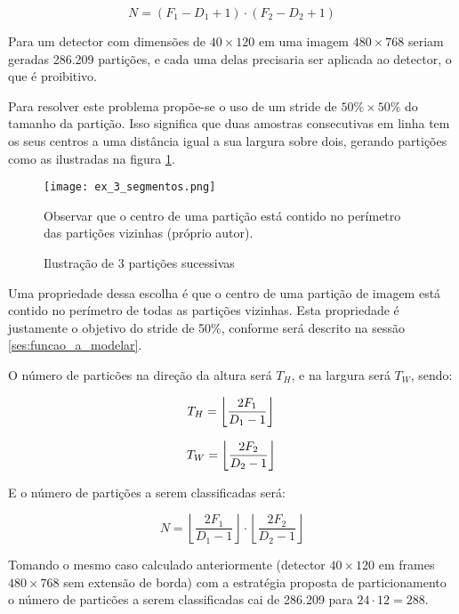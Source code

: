 \begin{equation}
	N = (F_1 - D_1 + 1) \cdot (F_2 - D_2 + 1)
\end{equation}

Para um detector com dimensões  de $40 \times 120$ em uma imagem
$480 \times 768$ seriam geradas 286.209 partições, e cada uma delas precisaria
ser aplicada ao detector, o que é proibitivo.

Para resolver este problema propõe-se o uso de um stride de
$50\% \times 50\%$ do tamanho da partição. Isso significa que duas amostras
consecutivas em linha tem os seus centros a uma distância igual a sua
largura sobre dois, gerando partições como as ilustradas na figura
\ref{fig:ex_3_segmentos}.

\begin{figure}[!htb]
	\centering
	\texttt{[image: ex\_3\_segmentos.png]}
	\caption{Ilustração de 3 partições sucessivas}
	\label{fig:ex_3_segmentos}
	Observar que o centro de uma partição está contido no perímetro das
	partições vizinhas (próprio autor).
\end{figure}

Uma propriedade dessa escolha é que o centro de uma partição de imagem está
contido no perímetro de todas as partições vizinhas. Esta propriedade é
justamente o objetivo do stride de 50\%, conforme será descrito na sessão
\ref{ses:funcao_a_modelar}.

O número de particões na direção da altura será $T_H$, e na largura será
$T_W$, sendo:

\begin{equation}
	T_H=\left\lfloor \frac{2F_1}{D_1-1} \right\rfloor \\
\end{equation}

\begin{equation}
	T_W=\left\lfloor \frac{2F_2}{D_2-1} \right\rfloor \\
\end{equation}

E o número de partições a serem classificadas será:

\begin{equation}
	N=\left\lfloor \frac{2F_1}{D_1-1} \right\rfloor \cdot
		\left\lfloor \frac{2F_2}{D_2-1} \right\rfloor
\end{equation}

Tomando o mesmo caso calculado anteriormente (detector $40 \times 120$ em
frames $480 \times 768$ sem extensão de borda) com a estratégia proposta
de particionamento o número de particões a serem classificadas cai de 286.209
para $24 \cdot 12=288$.

